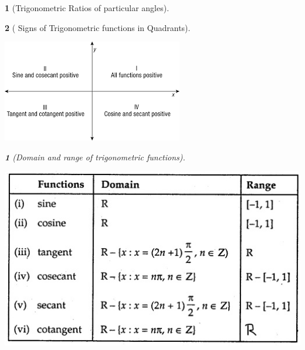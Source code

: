 \documentclass[12pt]{article}
\theoremstyle{colored}
\newtheorem*{defn}{}
\theoremstyle{subcolored}
\newtheorem*{subdefn}{}
\begin{document}
\begin{multicols}{2}
\begin{subdefn}[Trigonometric Ratios of particular angles]
\end{subdefn}

\begin{subdefn}[  Signs of Trigonometric functions in Quadrants]
  \begin{center}
    \includegraphics[scale=0.7]{img9.png}
  \end{center}

  \begin{defn}[Domain and range of trigonometric functions]
    \begin{center}
      \includegraphics[scale=0.5]{im10.jpg}
    \end{center}
    
  \end{defn}


\end{subdefn}
\end{multicols}
\end{document}
